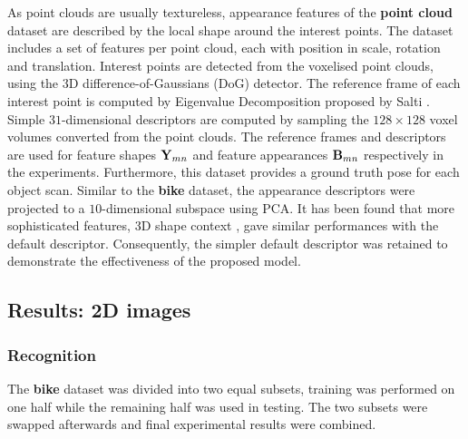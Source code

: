 As point clouds are usually textureless, appearance features of the \textbf{point cloud} dataset are described by the local shape around the interest points. 
The dataset includes a set of features per point cloud, each with position in scale, rotation and translation.
Interest points are detected from the voxelised point clouds, using the 3D difference-of-Gaussians (DoG) detector. 
The reference frame of each interest point is computed by Eigenvalue Decomposition proposed by Salti \etal \cite{Salti2014}. 
Simple $31$-dimensional descriptors are computed by sampling the $128 \times 128$ voxel volumes converted from the point clouds. The reference frames and descriptors are used for feature shapes $\mathbf{Y}_{mn}$ and feature appearances $\mathbf{B}_{mn}$ respectively in the experiments. 
Furthermore, this dataset provides a ground truth pose for each object scan.
Similar to the \textbf{bike} dataset, the appearance descriptors were projected to a $10$-dimensional subspace using PCA.   
It has been found that more sophisticated features, \eg 3D shape context \cite{Frome2004}, gave similar performances with the default descriptor. Consequently, the simpler default descriptor was retained to demonstrate the effectiveness of the proposed model.


\subsection{Results: 2D images}

\subsubsection{Recognition}

The \textbf{bike} dataset was divided into two equal subsets, training was performed on one half while the remaining half was used in testing. The two subsets were swapped afterwards and final experimental results were combined.

